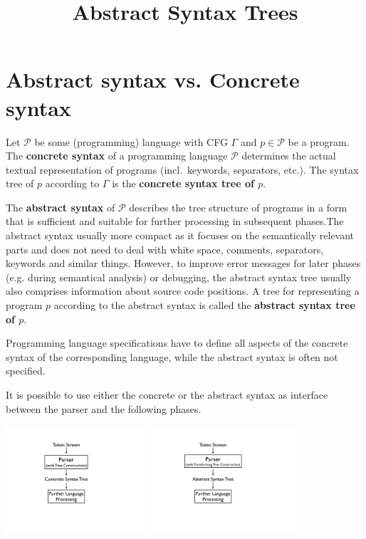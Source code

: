 \documentclass{scrartcl}
\title{Abstract Syntax Trees}
\author{}
\newcommand{\term}[1]{\textbf{#1}}
\newcommand{\pl}{\mathcal{P}}
\begin{document}
\maketitle

\tableofcontents

\section{Abstract syntax vs. Concrete syntax}
\label{sec:conc-vs-abs-syntax}

Let $\pl$ be some (programming) language with CFG $\Gamma$ and $p\in \pl$ be a program.
The \term{concrete syntax} of a programming language $\pl$ determines the actual textual representation of programs (incl.\ keywords, separators, etc.).
The syntax tree of $p$ according to $\Gamma$ is the \term{concrete syntax tree of $p$}.

The \term{abstract syntax} of $\pl$ describes the tree structure of
programs in a form that is sufficient and suitable for further processing in subsequent phases.The abstract syntax usually more compact as it focuses on the semantically relevant parts and does not
need to deal with white space, comments, separators, keywords and similar things.
However, to improve error messages for later phases (e.g. during semantical analysis) or debugging, the abstract syntax tree usually also comprises information about source code positions.
A tree for representing a program $p$ according to the abstract syntax is called
the \term{abstract syntax tree of $p$}.

Programming language specifications have to define all aspects of the concrete syntax of the corresponding language, while the abstract syntax is often not specified.

It is possible to use either the concrete or the abstract syntax as interface between the parser and the following phases.

\begin{center}
\includegraphics[height=4cm]{conctreeprocess}
\hspace{3cm}
\includegraphics[height=4cm]{abstreeprocess}
\end{center}
\end{document}
